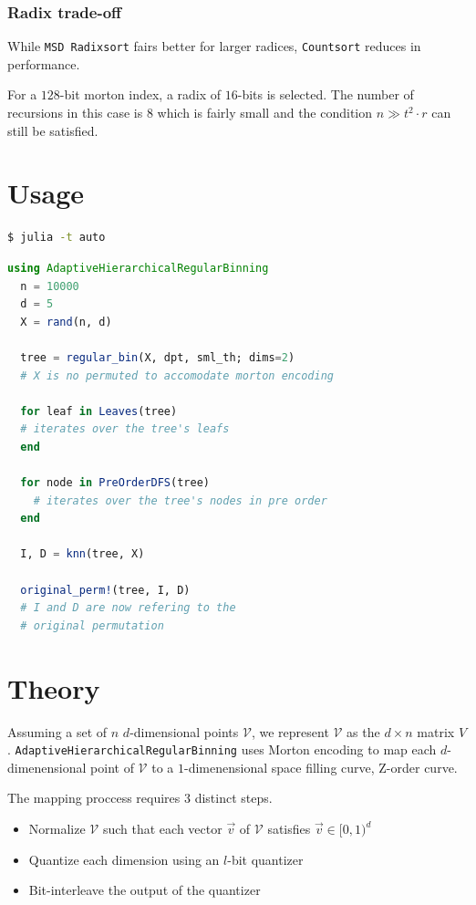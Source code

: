 \documentclass{juliacon}
\begin{document}
\subsubsection{Radix trade-off}
While \verb|MSD Radixsort| fairs better for larger radices, \verb|Countsort| reduces in
performance.

\begin{example}
  For a $128$-bit morton index, a radix of $16$-bits is selected.
  The number of recursions in this case is $8$ which is fairly small and the condition
  $n\gg t^2\cdot r$ can still be satisfied.
\end{example}

\section{Usage}

\begin{lstlisting}[language = Bash]
  $ julia -t auto
\end{lstlisting}

\begin{lstlisting}[language = Julia]
  using AdaptiveHierarchicalRegularBinning
  n = 10000
  d = 5
  X = rand(n, d)

  tree = regular_bin(X, dpt, sml_th; dims=2)
  # X is no permuted to accomodate morton encoding

  for leaf in Leaves(tree)
  # iterates over the tree's leafs
  end

  for node in PreOrderDFS(tree)
    # iterates over the tree's nodes in pre order
  end

  I, D = knn(tree, X)

  original_perm!(tree, I, D)
  # I and D are now refering to the
  # original permutation
\end{lstlisting}


\section{Theory}
Assuming a set of $n$ $d$-dimensional points $\mathcal{V}$, we represent $\mathcal{V}$ as
the $d \times n$ matrix $V$. \verb|AdaptiveHierarchicalRegularBinning| uses Morton
encoding to map each $d$-dimenensional point of $\mathcal{V}$ to a $1$-dimenensional
space filling curve, Z-order curve.

The mapping proccess requires 3 distinct steps.

\begin{itemize}
  \item Normalize $\mathcal{V}$ such that each vector $\vec{v}$ of $\mathcal{V}$
  satisfies $\vec{v} \in [0,1)^d$
  \item Quantize each dimension using an $l$-bit quantizer
  \item Bit-interleave the output of the quantizer
\end{itemize}
\end{document}
